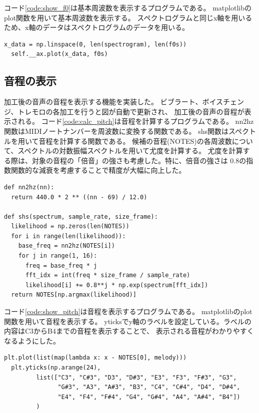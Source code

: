 \documentclass[a4paper,11pt]{jsarticle}
\begin{document}
コード\ref{code:show_f0}は基本周波数を表示するプログラムである。
matplotlibのplot関数を用いて基本周波数を表示する。
スペクトログラムと同じx軸を用いるため、x軸のデータはスペクトログラムのデータを用いる。

\begin{lstlisting}[caption=基本周波数表示,label=code:show_f0]
  x_data = np.linspace(0, len(spectrogram), len(f0s))
  self.__ax.plot(x_data, f0s)
\end{lstlisting}

\subsection{音程の表示}
加工後の音声の音程を表示する機能を実装した。
ビブラート、ボイスチェンジ、トレモロの各加工を行うと図が自動で更新され、
加工後の音声の音程が表示される。
コード\ref{code:calc_pitch}は音程を計算するプログラムである。
nn2hz関数はMIDIノートナンバーを周波数に変換する関数である。
shs関数はスペクトルを用いて音程を計算する関数である。
候補の音程(NOTES)の各周波数について、スペクトルの対数振幅スペクトルを用いて尤度を計算する。
尤度を計算する際は、対象の音程の「倍音」の強さも考慮した。特に、倍音の強さは
0.8の指数関数的な減衰を考慮することで精度が大幅に向上した。

\begin{lstlisting}[caption=音程計算,label=code:calc_pitch]
def nn2hz(nn):
  return 440.0 * 2 ** ((nn - 69) / 12.0)

def shs(spectrum, sample_rate, size_frame):
  likelihood = np.zeros(len(NOTES))
  for i in range(len(likelihood)):
    base_freq = nn2hz(NOTES[i])
    for j in range(1, 16):
      freq = base_freq * j
      fft_idx = int(freq * size_frame / sample_rate)
      likelihood[i] += 0.8**j * np.exp(spectrum[fft_idx])
  return NOTES[np.argmax(likelihood)]

\end{lstlisting}

コード\ref{code:show_pitch}は音程を表示するプログラムである。
matplotlibのplot関数を用いて音程を表示する。
yticksでy軸のラベルを設定している。ラベルの内容はC3からB4までの音程を表示することで、
表示される音程がわかりやすくなるようにした。

\begin{lstlisting}[caption=音程表示,label=code:show_pitch]
  plt.plot(list(map(lambda x: x - NOTES[0], melody)))
  plt.yticks(np.arange(24),
         list(["C3", "C#3", "D3", "D#3", "E3", "F3", "F#3", "G3",
               "G#3", "A3", "A#3", "B3", "C4", "C#4", "D4", "D#4",
               "E4", "F4", "F#4", "G4", "G#4", "A4", "A#4", "B4"])
         )
\end{lstlisting}
\end{document}
